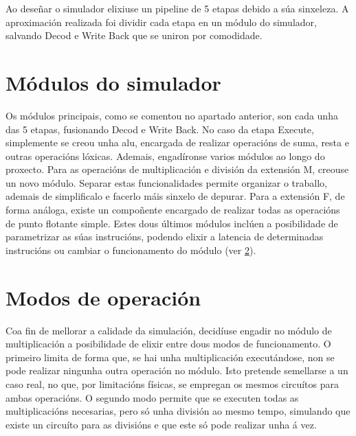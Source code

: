 Ao deseñar o simulador elixiuse un pipeline de 5 etapas debido a súa sinxeleza. A aproximación realizada foi dividir cada etapa en un módulo do simulador, salvando Decod e Write Back que se uniron por comodidade.

\section{Módulos do simulador}\label{sec:modulo_sim}
Os módulos principais, como se comentou no apartado anterior, son cada unha das 5 etapas, fusionando Decod e Write Back. No caso da etapa Execute, simplemente se creou unha \acrshort{alu}, encargada de realizar operacións de suma, resta e outras operacións lóxicas. Ademais, engadíronse varios módulos ao longo do proxecto. Para as operacións de multiplicación e división da extensión M, creouse un novo módulo. Separar estas funcionalidades permite organizar o traballo, ademais de simplificalo e facerlo máis sinxelo de depurar. Para a extensión F, de forma análoga, existe un compoñente encargado de realizar todas as operacións de punto flotante simple. Estes dous últimos módulos inclúen a posibilidade de parametrizar as súas instrucións, podendo elixir a latencia de determinadas instrucións ou cambiar o funcionamento do módulo (ver \ref{sec:modos_op}).

\section{Modos de operación}\label{sec:modos_op}
Coa fin de mellorar a calidade da simulación, decidíuse engadir no módulo de multiplicación a posibilidade de elixir entre dous modos de funcionamento. O primeiro limita de forma que, se hai unha multiplicación executándose, non se pode realizar ningunha outra operación no módulo. Isto pretende semellarse a un caso real, no que, por limitacións físicas, se empregan os mesmos circuítos para ambas operacións. O segundo modo permite que se executen todas as multiplicacións necesarias, pero só unha división ao mesmo tempo, simulando que existe un circuíto para as divisións e que este só pode realizar unha á vez.


